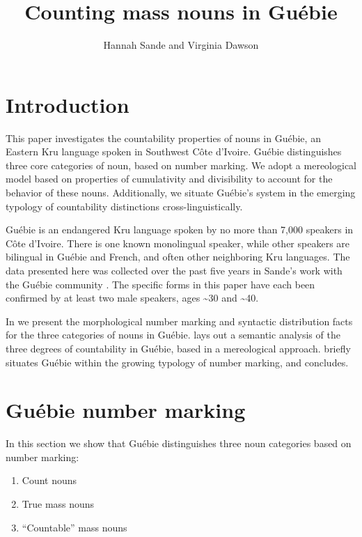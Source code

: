 \documentclass[output=paper,colorlinks,citecolor=brown]{langscibook}
\title{Counting mass nouns in Guébie}
\author{Hannah Sande\affiliation{Georgetown University} and Virginia Dawson\affiliation{University of California, Berkeley}}
\begin{document}
\maketitle 

\section{Introduction}\label{sec:sande:1}

This paper investigates the countability properties of nouns in Guébie, an Eastern Kru language spoken in Southwest Côte d'Ivoire. Guébie distinguishes three core categories of noun, based on number marking. We adopt a mereological model based on properties of cumulativity and divisibility to account for the behavior of these nouns. Additionally, we situate Guébie's system in the emerging typology of countability distinctions cross-linguistically.

Guébie is an endangered Kru language spoken by no more than 7,000 speakers in Côte d'Ivoire. There is one known monolingual speaker, while other speakers are bilingual in Guébie and French, and often other neighboring Kru languages. The data presented here was collected over the past five years in Sande's work with the Guébie community \citep{Sande2017}. The specific forms in this paper have each been confirmed by at least two male speakers, ages \~{}30 and \~{}40.

In  we present the morphological number marking and syntactic distribution facts for the three categories of nouns in Guébie.  lays out a semantic analysis of the three degrees of countability in Guébie, based in a mereological approach.  briefly situates Guébie within the growing typology of number marking, and  concludes.

\section{Guébie number marking}\label{sec:sande:2}

In this section we show that Guébie distinguishes three noun categories based on number marking:

\begin{enumerate}
	\item Count nouns
	\item True mass nouns
	\item ``Countable'' mass nouns
\end{enumerate}
\end{document}

